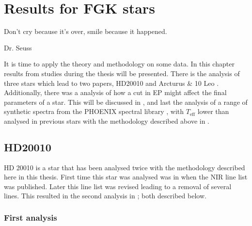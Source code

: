 \chapter{Results for FGK stars}
\label{cha:results}
\epigraph{Don't cry because it's over, smile because it happened.}{Dr. Seuss}

It is time to apply the theory and methodology on some data. In this chapter results from studies
during the thesis will be presented. There is the analysis of three stars which lead to two papers,
HD20010 \citep{Andreasen2016} and Arcturus \& 10 Leo \citep{Andreasen2017b}. Additionally, there was
a analysis of how a cut in EP might affect the final parameters of a star. This will be discussed in
, and last the analysis of a range of synthetic spectra from the PHOENIX spectral
library \citep{Husser2013}, with $T_\mathrm{eff}$ lower than analysed in previous stars with the
methodology described above in .


\section{HD20010}
\label{sec:HD20010}

HD 20010 is a star that has been analysed twice with the methodology described here in this thesis.
First time this star was analysed was in \citet{Andreasen2016} when the NIR line list was published.
Later this line list was revised leading to a removal of several lines. This resulted in the second
analysis in \citet{Andreasen2017b}; both described below.

\subsection{First analysis}

